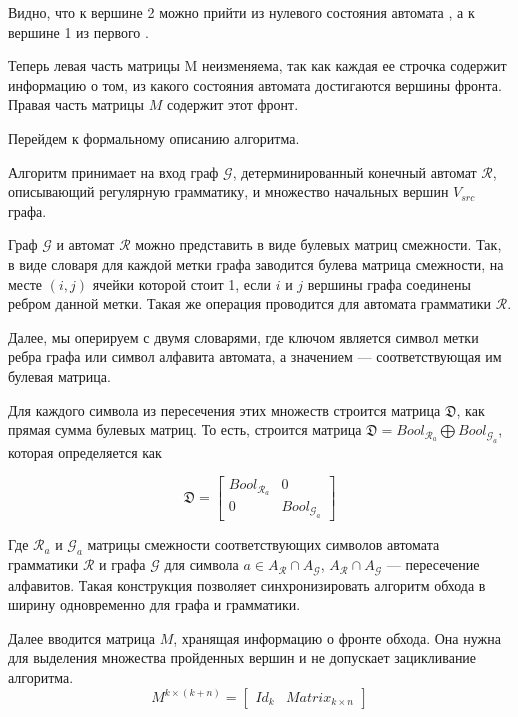 Видно, что к вершине 2 можно прийти из нулевого состояния автомата  , а к вершине 1 из первого  .

Теперь левая часть матрицы M неизменяема, так как каждая ее строчка содержит информацию о том, из какого состояния автомата достигаются вершины фронта.
Правая часть матрицы $M$ содержит этот фронт.


Перейдем к формальному описанию алгоритма.


Алгоритм принимает на вход граф $\mathcal{G}$, детерминированный конечный автомат $\mathcal{R}$, описывающий регулярную грамматику, и множество начальных вершин $V_{src}$ графа.

Граф $\mathcal{G}$ и автомат $\mathcal{R}$ можно представить в виде булевых матриц смежности. Так, в виде словаря для каждой метки графа заводится булева матрица смежности, на месте $(i, j)$ ячейки которой стоит 1, если $i$ и $j$ вершины графа соединены ребром данной метки. Такая же операция проводится для автомата грамматики $\mathcal{R}$.

Далее, мы оперируем с двумя словарями, где ключом является символ метки ребра графа или символ алфавита автомата, а значением --- соответствующая им булевая матрица.

Для каждого символа из пересечения этих множеств строится матрица $\mathfrak{D}$, как прямая сумма булевых матриц. То есть, строится матрица $\mathfrak{D} = Bool_{\mathcal{R}_a} \bigoplus Bool_{\mathcal{G}_a}$, которая определяется как

\begin{equation}
\mathfrak{D} = 
  \left[
    \begin{matrix}
        Bool_{\mathcal{R}_a} & 0\\
        0 & Bool_{\mathcal{G}_a}
    \end{matrix}
  \right]
\end{equation}

Где $\mathcal{R}_{a}$ и $\mathcal{G}_{a}$ матрицы смежности соответствующих символов автомата грамматики $\mathcal{R}$ и графа $\mathcal{G}$ для символа $a \in A_\mathcal{R} \cap A_\mathcal{G}$, $A_\mathcal{R} \cap A_\mathcal{G}$ --- пересечение алфавитов. Такая конструкция позволяет синхронизировать алгоритм обхода в ширину одновременно для графа и грамматики.

Далее вводится матрица $M$, хранящая информацию о фронте обхода. Она нужна для выделения множества пройденных вершин и не допускает зацикливание алгоритма.
\begin{equation}
M^{k \times (k + n)} =
  \left[
    \begin{matrix}
        Id_k & Matrix_{k \times n }
    \end{matrix}
  \right]
\end{equation}

